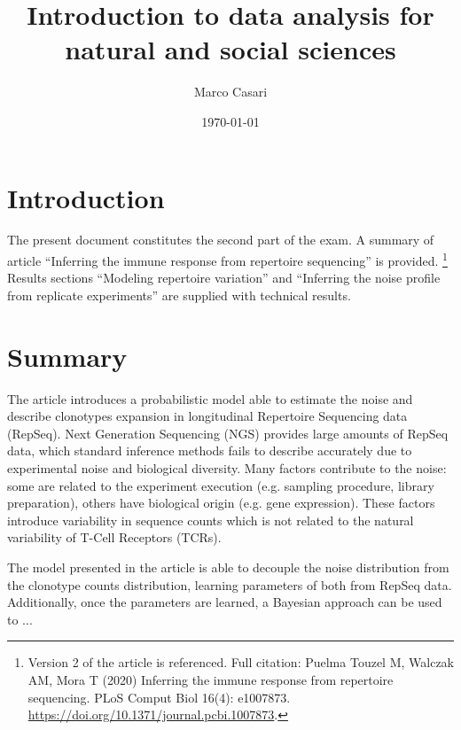 \documentclass[a4paper,twocolumn]{article}
\title{Introduction to data analysis for natural and social sciences}
\author{Marco Casari}
\date{\today}
\begin{document}
\maketitle

\section{Introduction}
The present document constitutes the second part of the exam. A summary of article ``Inferring the immune response from repertoire sequencing'' is provided.%
\footnote{Version 2 of the article is referenced. Full citation: Puelma Touzel M, Walczak AM, Mora T (2020) Inferring the immune response from repertoire sequencing. PLoS Comput Biol 16(4): e1007873. \url{https://doi.org/10.1371/journal.pcbi.1007873}.}
Results sections ``Modeling repertoire variation'' and ``Inferring the noise profile from replicate experiments'' are supplied with technical results.



\section{Summary}
The article introduces a probabilistic model able to estimate the noise and describe clonotypes expansion in longitudinal Repertoire Sequencing data (RepSeq).
Next Generation Sequencing (NGS) provides large amounts of RepSeq data, which standard inference methods fails to describe accurately due to experimental noise and biological diversity. Many factors contribute to the noise: some are related to the experiment execution (e.g. sampling procedure, library preparation), others have biological origin (e.g. gene expression). These factors introduce variability in sequence counts which is not related to the natural variability of T-Cell Receptors (TCRs).

The model presented in the article is able to decouple the noise distribution from the clonotype counts distribution, learning parameters of both from RepSeq data. Additionally, once the parameters are learned, a Bayesian approach can be used to ...
\end{document}

